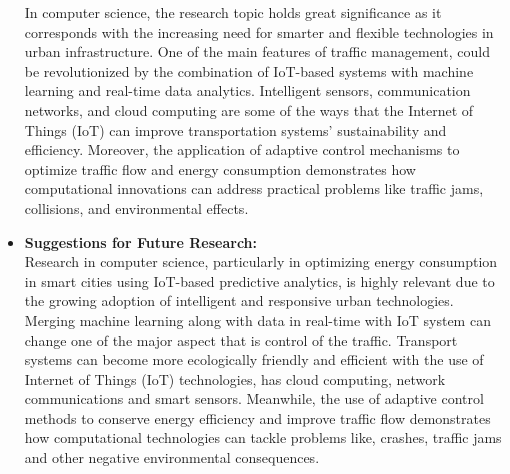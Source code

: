\documentclass[12pt,a4paper]{article}
\begin{document}
\begin{itemize}
     In computer science, the research topic holds great significance as it corresponds with the increasing need for smarter and flexible technologies in urban infrastructure. One of the main features of traffic management, could be revolutionized by the combination of IoT-based systems with machine learning and real-time data analytics. Intelligent sensors, communication networks, and cloud computing are some of the ways that the Internet of Things (IoT) can improve transportation systems' sustainability and efficiency. Moreover, the application of adaptive control mechanisms to optimize traffic flow and energy consumption demonstrates how computational innovations can address practical problems like traffic jams, collisions, and environmental effects. 
     
    \item \textbf{Suggestions for Future Research:}\\
    
    Research in computer science, particularly in optimizing energy consumption in smart cities using IoT-based predictive analytics, is highly relevant due to the growing adoption of intelligent and responsive urban technologies. Merging machine learning along with data in real-time with IoT system can change one of the major aspect that is control of the traffic. Transport systems can become more ecologically friendly and efficient with the use of Internet of Things (IoT) technologies, has cloud computing, network communications and smart sensors. Meanwhile, the use of adaptive control methods to conserve energy efficiency and improve traffic flow demonstrates how computational technologies can tackle problems like, crashes, traffic jams and other negative environmental consequences. 
\end{itemize}

\newpage
\end{document}
